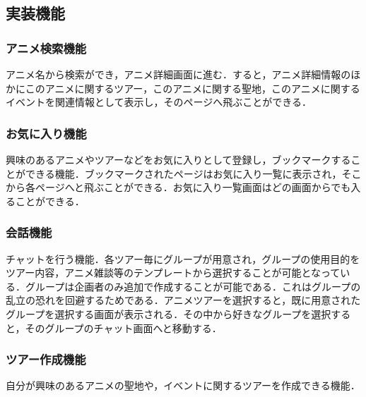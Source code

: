 \subsection{実装機能}


\subsubsection{アニメ検索機能}
\par
アニメ名から検索ができ，アニメ詳細画面に進む．すると，アニメ詳細情報のほかにこのアニメに関するツアー，このアニメに関する聖地，このアニメに関するイベントを関連情報として表示し，そのページへ飛ぶことができる．

\subsubsection{お気に入り機能}
\par
興味のあるアニメやツアーなどをお気に入りとして登録し，ブックマークすることができる機能．ブックマークされたページはお気に入り一覧に表示され，そこから各ページへと飛ぶことができる．お気に入り一覧画面はどの画面からでも入ることができる．

\subsubsection{会話機能}
\par
チャットを行う機能．各ツアー毎にグループが用意され，グループの使用目的をツアー内容，アニメ雑談等のテンプレートから選択することが可能となっている．グループは企画者のみ追加で作成することが可能である．これはグループの乱立の恐れを回避するためである．アニメツアーを選択すると，既に用意されたグループを選択する画面が表示される．その中から好きなグループを選択すると，そのグループのチャット画面へと移動する．

\subsubsection{ツアー作成機能}
\par
自分が興味のあるアニメの聖地や，イベントに関するツアーを作成できる機能．

